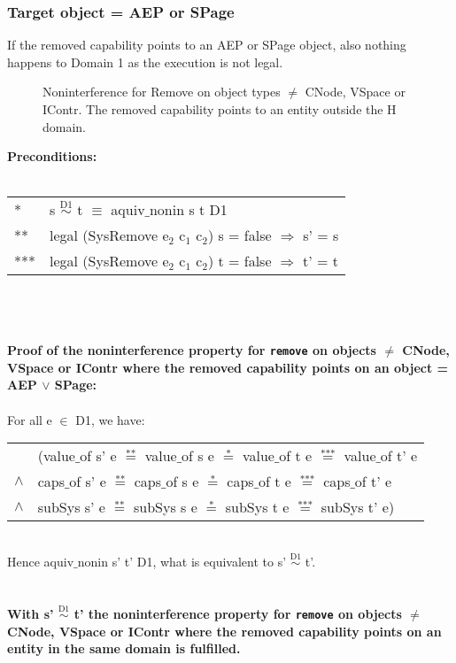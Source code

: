 \subsubsection{Target object = AEP or SPage}
If the removed capability points to an AEP or SPage object, also nothing happens to Domain 1 as the execution is not legal. 
\begin{figure}[H]
\caption{Noninterference for Remove on object types $\neq$ CNode, VSpace or IContr. The removed capability points to an entity outside the H domain.}
\label{fig:RemoveOutside2}
\end{figure}
\textbf{Preconditions:} \\ \\
\begin{tabular}{ll}
* & s $\overset{\text{D1}}{\sim}$ t $\equiv$ aquiv$\_$nonin s t D1	\\ 
** & legal (SysRemove e$_2$ c$_1$ c$_2$) s = false $\Rightarrow$ s' = s \\ 
*** & legal (SysRemove e$_2$ c$_1$ c$_2$) t = false $\Rightarrow$ t' = t
\end{tabular} \\ \\ \\
\textbf{Proof of the noninterference property for \texttt{remove} on objects $\neq$ CNode, VSpace or IContr where the removed capability points on an object = AEP $\vee$ SPage:}\\ \\
For all e $\in$ D1, we have: \\ 
\begin{tabular}{ll}
& (value$\_$of s' e $\overset{\text{**}}{=}$ value$\_$of s e $\overset{\text{*}}{=}$ value$\_$of t e $\overset{\text{***}}{=}$ value$\_$of t' e \\
$\wedge$ & caps$\_$of s' e $\overset{\text{**}}{=}$ caps$\_$of s e $\overset{\text{*}}{=}$ caps$\_$of t e $\overset{\text{***}}{=}$ caps$\_$of t' e \\
$\wedge$ & subSys s' e $\overset{\text{**}}{=}$ subSys s e $\overset{\text{*}}{=}$ subSys t e $\overset{\text{***}}{=}$ subSys t' e)
\end{tabular} \\
Hence aquiv$\_$nonin s' t' D1, what is equivalent to s' $\overset{\text{D1}}{\sim}$ t'.\\ \\ \\
\textbf{With s' $\overset{\text{D1}}{\sim}$ t' the noninterference property for \texttt{remove} on objects $\neq$ CNode, VSpace or IContr where the removed capability points on an entity in the same domain is fulfilled.}  